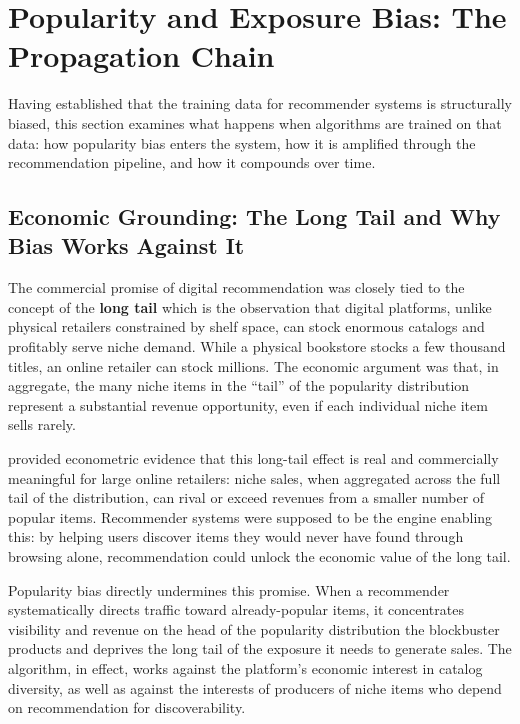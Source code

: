 \documentclass[11pt,a4paper]{report}
\begin{document}
\section{Popularity and Exposure Bias: The Propagation Chain}
\label{sec:lit_popularity}

Having established that the training data for recommender systems is structurally biased, this section examines what happens when algorithms are trained on that data: how popularity bias enters the system, how it is amplified through the recommendation pipeline, and how it compounds over time.

\subsection*{Economic Grounding: The Long Tail and Why Bias Works Against It}

The commercial promise of digital recommendation was closely tied to the concept of the \textbf{long tail} \citep{anderson2004long} which is the observation that digital platforms, unlike physical retailers constrained by shelf space, can stock enormous catalogs and profitably serve niche demand. While a physical bookstore stocks a few thousand titles, an online retailer can stock millions. The economic argument was that, in aggregate, the many niche items in the ``tail'' of the popularity distribution represent a substantial revenue opportunity, even if each individual niche item sells rarely.

\citet{brynjolfsson2006niches} provided econometric evidence that this long-tail effect is real and commercially meaningful for large online retailers: niche sales, when aggregated across the full tail of the distribution, can rival or exceed revenues from a smaller number of popular items. Recommender systems were supposed to be the engine enabling this: by helping users discover items they would never have found through browsing alone, recommendation could unlock the economic value of the long tail.

Popularity bias directly undermines this promise. When a recommender systematically directs traffic toward already-popular items, it concentrates visibility and revenue on the head of the popularity distribution the blockbuster products and deprives the long tail of the exposure it needs to generate sales. The algorithm, in effect, works against the platform's economic interest in catalog diversity, as well as against the interests of producers of niche items who depend on recommendation for discoverability.
\end{document}
